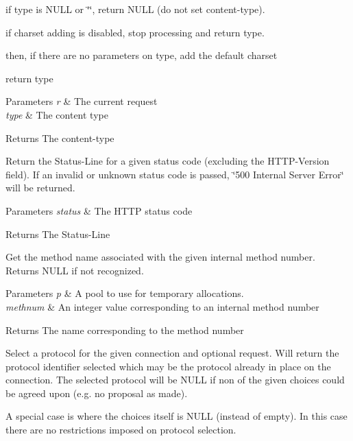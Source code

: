 \begin{DoxyItemize}
\item if type is N\+U\+LL or \char`\"{}\char`\"{}, return N\+U\+LL (do not set content-\/type).
\item if charset adding is disabled, stop processing and return type.
\item then, if there are no parameters on type, add the default charset
\item return type 
\begin{DoxyParams}{Parameters}
{\em r} & The current request \\
\hline
{\em type} & The content type \\
\hline
\end{DoxyParams}
\begin{DoxyReturn}{Returns}
The content-\/type
\end{DoxyReturn}
Return the Status-\/\+Line for a given status code (excluding the H\+T\+T\+P-\/\+Version field). If an invalid or unknown status code is passed, \char`\"{}500 Internal Server Error\char`\"{} will be returned. 
\begin{DoxyParams}{Parameters}
{\em status} & The H\+T\+TP status code \\
\hline
\end{DoxyParams}
\begin{DoxyReturn}{Returns}
The Status-\/\+Line
\end{DoxyReturn}
Get the method name associated with the given internal method number. Returns N\+U\+LL if not recognized. 
\begin{DoxyParams}{Parameters}
{\em p} & A pool to use for temporary allocations. \\
\hline
{\em methnum} & An integer value corresponding to an internal method number \\
\hline
\end{DoxyParams}
\begin{DoxyReturn}{Returns}
The name corresponding to the method number
\end{DoxyReturn}
Select a protocol for the given connection and optional request. Will return the protocol identifier selected which may be the protocol already in place on the connection. The selected protocol will be N\+U\+LL if non of the given choices could be agreed upon (e.\+g. no proposal as made).
\end{DoxyItemize}

A special case is where the choices itself is N\+U\+LL (instead of empty). In this case there are no restrictions imposed on protocol selection.


